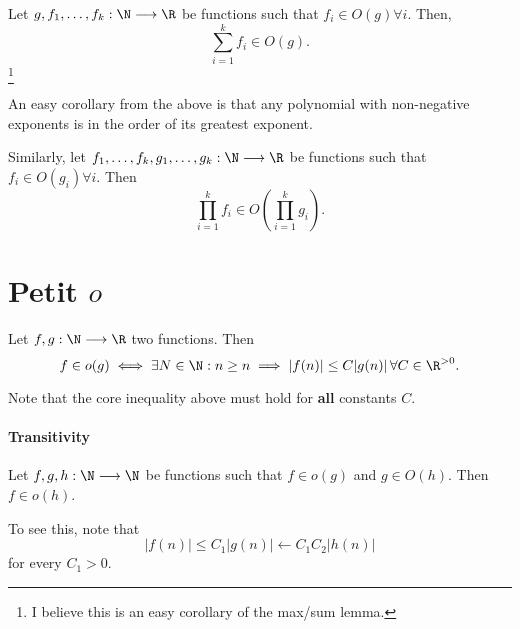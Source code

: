 

Let $g,f_1,\ldots,f_k: \N \longrightarrow \R$ be functions such that $f_i \in O(g) \forall i$.
Then, \[
\sum_{i=1}^{k} f_i \in O(g)
.\]\footnote{I believe this is an easy corollary of the max/sum lemma.}

An easy corollary from the above is that any polynomial with non-negative exponents is in the order of its greatest exponent.

Similarly, let $f_1,\ldots,f_k,g_1,\ldots,g_k: \N \longrightarrow \R$ be functions such that $f_i \in O(g_i) \forall i$.
Then \[
\prod_{i=1}^{k} f_i \in O\left( \prod_{i=1}^{k} g_i \right)  
.\] 

\section*{Petit $o$}

Let $f,g: \N \longrightarrow \R$ two functions.
Then \[
f\in o(g) \iff \exists N\in \N : n\ge n \implies |f(n)| \le C|g(n)|\,\forall C \in \R^{>0}
.\] 

Note that the core inequality above must hold for \textbf{all} constants $C$.

\paragraph{Transitivity}
Let $f,g,h: \N \longrightarrow \N$ be functions such that $f\in o(g)$ and $g\in O(h)$.
Then $f\in o(h)$.

To see this, note that \[
|f(n)| \le C_1|g(n)| \gets C_1 C_2 |h(n)|
\] for every $C_1>0$.

